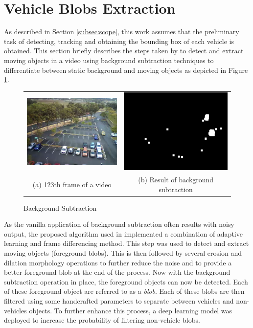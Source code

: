 \section{Vehicle Blobs Extraction}
\label{subsection:fundamental}

As described in Section \ref{subsec:scope}, this work assumes that the preliminary task of detecting, tracking and obtaining the bounding box of each vehicle is obtained. This section briefly describes the steps taken by  to detect and extract moving objects in a video using background subtraction techniques to differentiate between static background and moving objects as depicted in Figure \ref{fig:bgs}. 

\begin{figure}[htb!]
  \centering
\begin{tabular}{cc}
 \includegraphics[width=0.4\linewidth]{image/general/bgs1.png} &  \includegraphics[width=0.4\linewidth]{image/general/bgs2.png}  \\ 
(a) 123th frame of a video & (b) Result of background subtraction \\
\end{tabular}
\caption{Background Subtraction} 
\label{fig:bgs}
\end{figure}

As the vanilla application of background subtraction often results with noisy output, the proposed algorithm used in \cite{lim2017} implemented a combination of adaptive learning and frame differencing method. This step was used to detect and extract moving objects (foreground blobs). This is then followed by several erosion and dilation morphology operations to further reduce the noise and to provide a better foreground blob at the end of the process. 
Now with the background subtraction operation in place, the foreground objects can now be detected. Each of these foreground object are referred to as a \textit{blob}. Each of these blobs are then filtered using some handcrafted parameters to separate between vehicles and non-vehicles objects. To further enhance this process, a deep learning model was deployed to increase the probability of filtering non-vehicle blobs. 


